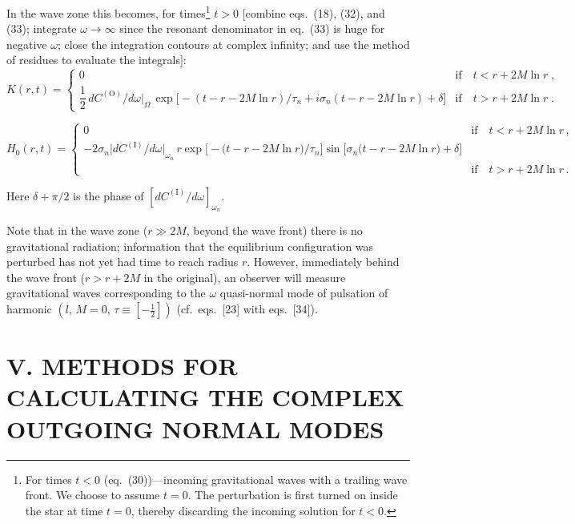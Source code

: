 \documentclass[12pt]{article}
\begin{document}
In the wave zone this becomes, for times\footnote{For times $t < 0$ (eq.\ (30))---incoming gravitational waves
with a trailing wave front. We choose to assume $t = 0$. The perturbation is first turned on inside the star
at time $t = 0$, thereby discarding the incoming solution for $t < 0$.} $t > 0$ [combine eqs.\ (18), (32), and (33); integrate $\omega \to \infty$ since the resonant denominator in eq.\ (33) is huge for negative
$\omega$; close the integration contours at complex infinity; and use the method of residues to
evaluate the integrals]:
%
\begin{equation}
  K(r,t)
  = \begin{cases}
      0 & \text{if} \quad t < r + 2M\ln r \;, \\[4pt]
      \dfrac{1}{2}\,dC^{(\mathrm{O})}/d\omega\big|_{\Omega}\,
        \exp\!\bigl[-(t - r - 2M\ln r)/\tau_{n} + i\sigma_{n}(t - r - 2M\ln r) + \delta\bigr]
      & \text{if} \quad t > r + 2M\ln r \;.
    \end{cases}
  \tag{34a}
\end{equation}

\begin{equation}
H_0(r,t) =
\begin{cases}
0 & \text{if} \quad t < r + 2M \ln r \,, \\[6pt]
-2\sigma_n \bigl|dC^{(\mathrm{I})}/d\omega\bigr|_{\omega_n}\, r \exp\bigl[-\bigl(t - r - 2M\ln r\bigr)/\tau_n\bigr]
\sin\bigl[\sigma_n\bigl(t - r - 2M\ln r\bigr) + \delta\bigr] & \\[2pt]
& \text{if} \quad t > r + 2M \ln r \,.
\end{cases}
\tag{34b}
\end{equation}

Here $\delta + \pi/2$ is the phase of $[dC^{(\mathrm{I})}/d\omega]_{\omega_n}$.

Note that in the wave zone ($r \gg 2M$, beyond the wave front) there is no gravitational radiation; information that the equilibrium configuration was perturbed has not yet had time to reach radius $r$. However, immediately behind the wave front ($r > r + 2M$ in the original), an observer will measure gravitational waves corresponding to the $\omega$ quasi-normal mode of pulsation of harmonic $(l,\, M = 0,\, \tau \equiv [-\frac{1}{2}])$ (cf.\ eqs.\ [23] with eqs.\ [34]).

\section*{V. METHODS FOR CALCULATING THE COMPLEX OUTGOING NORMAL MODES}
\end{document}
